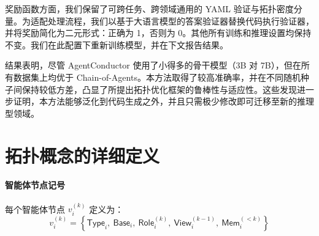 \documentclass{article}
\theoremstyle{definition}
\begin{document}
奖励函数方面，我们保留了可跨任务、跨领域通用的 YAML 验证与拓扑密度分量。为适配处理流程，我们以基于大语言模型的答案验证器替换代码执行验证器，并将奖励简化为二元形式：正确为 1，否则为 0。其他所有训练和推理设置均保持不变。我们在此配置下重新训练模型，并在下文报告结果。

\begin{table}[h]
\centering
\caption{AgentConductor 在 GAIA、HLE 和 PopQA 上的跨域评估。结果为三个随机种子下的均值 $\pm$ 标准差。}
\label{tab:cross_domain}
\vspace{0.5em}

\setlength{\tabcolsep}{3pt} %
\renewcommand{\arraystretch}{1.15}
\fontsize{7.5pt}{9.5pt}\selectfont

\end{table}


结果表明，尽管 AgentConductor 使用了小得多的骨干模型（3B 对 7B），但在所有数据集上均优于 Chain-of-Agents。本方法取得了较高准确率，并在不同随机种子间保持较低方差，凸显了所提出拓扑优化框架的鲁棒性与适应性。这些发现进一步证明，本方法能够泛化到代码生成之外，并且只需极少修改即可迁移至新的推理型领域。


\section{拓扑概念的详细定义}
\label{appendix:notions}
\paragraph{智能体节点记号}
每个智能体节点 $v_i^{(k)}$ 定义为：
\[
v_i^{(k)} = \left\{
\textsf{Type}_i,\ \textsf{Base}_i,\ \textsf{Role}_i^{(k)},\ \textsf{View}_i^{(k-1)},\ \textsf{Mem}_i^{(<k)}
\right\}
\tag{1}
\]
\end{document}
